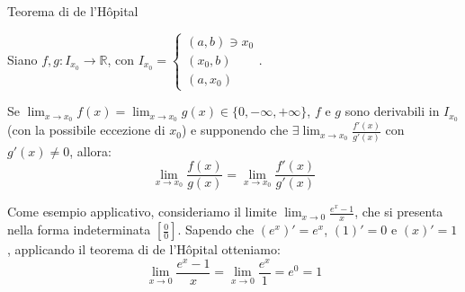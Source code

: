 \documentclass[12pt]{report}
\newcommand{\R}{\mathbb{R}}
\begin{document}
	\begin{teorema}{Teorema di de l'Hôpital}{}
		
		Siano $f, g: I_{x_0} \to \R$, con $I_{x_0} = \begin{cases} (a, b) \ni x_0 \\ (x_0, b) \\ (a, x_0) \end{cases}$.
		
		Se $\lim_{x \to x_0} f(x) = \lim_{x \to x_0} g(x) \in \{0, -\infty, +\infty\}$, $f$ e $g$ sono derivabili in $I_{x_0}$ (con la possibile eccezione di $x_0$) e supponendo che $\exists \lim_{x \to x_0} \frac{f'(x)}{g'(x)}$ con $g'(x) \neq 0$, allora:
		\[
		\lim_{x \to x_0} \frac{f(x)}{g(x)} = \lim_{x \to x_0} \frac{f'(x)}{g'(x)}
		\]
		
	\end{teorema}
	
	Come esempio applicativo, consideriamo il limite $\lim_{x \to 0} \frac{e^x - 1}{x}$, che si presenta nella forma indeterminata $\left[\frac{0}{0}\right]$. Sapendo che $(e^x)' = e^x$, $(1)' = 0$ e $(x)' = 1$, applicando il teorema di de l'Hôpital otteniamo:
	\[
	\lim_{x \to 0} \frac{e^x - 1}{x} = \lim_{x \to 0} \frac{e^x}{1} = e^0 = 1
	\]
	
\end{document}
